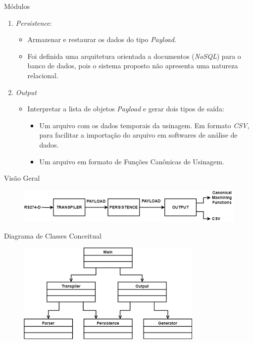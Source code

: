 \documentclass[aspectratio=169]{beamer}
\begin{document}
{\begin{frame}{Módulos}
\begin{enumerate}
    \item {
      \emph{Persistence}:
      \begin{itemize}
        \item Armazenar e restaurar os dados do tipo \emph{Payload}.
        \item Foi definida uma arquitetura orientada a documentos 
              (\emph{NoSQL}) para o banco de dados, pois o sistema 
              proposto não apresenta uma natureza relacional.
      \end{itemize}
    }

    \item {
      \emph{Output}
      \begin{itemize}
        \item Interpretar a lista de objetos \emph{Payload} 
              e gerar dois tipos de saída:
        \begin{itemize}
              \item Um arquivo com os dados temporais da usinagem. 
                    Em formato \emph{CSV}, para facilitar a importação 
                    do arquivo em softwares de análise de dados.
              \item Um arquivo em formato de Funções Canônicas de Usinagem.
        \end{itemize}
      \end{itemize}
    }

  \end{enumerate}
\end{frame}


\begin{frame}{Visão Geral}

  \begin{figure}[H]
    \centering
    \includegraphics[width=\textwidth]{images/idef0-main.png}
  \end{figure}

\end{frame}


\begin{frame}{Diagrama de Classes Conceitual}

  \begin{figure}[H]
    \centering
    \includegraphics[width=90mm]{images/class-main.png}
  \end{figure}


\end{frame}}
\end{document}
